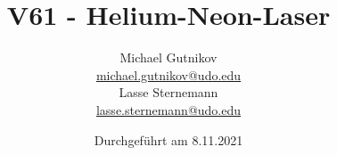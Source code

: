

\title{V61 - Helium-Neon-Laser}
\author{
  Michael Gutnikov\\
  \href{mailto:michael.gutnikov@udo.edu}{michael.gutnikov@udo.edu}\\
  Lasse Sternemann\\
  \href{mailto:lasse.sternemann@udo.edu}{lasse.sternemann@udo.edu}
}
\date{Durchgeführt am 8.11.2021}


    \maketitle
    \newpage
    \tableofcontents
    \newpage

    

    \newpage
    \printbibliography

